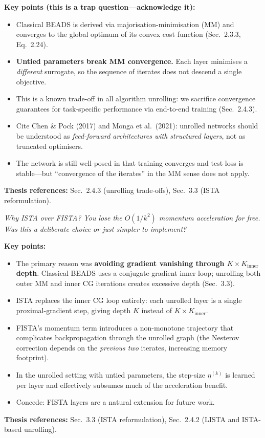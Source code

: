 \documentclass[11pt, letterpaper]{article}
\newcounter{qcounter}
\newcommand{\question}[1]{%
  \stepcounter{qcounter}%
  \begin{questionbox}[Q\theqcounter]%
    \itshape #1%
  \end{questionbox}%
}
\begin{document}
\begin{answerbox}
\textbf{Key points (this is a trap question---acknowledge it):}
\begin{itemize}[nosep]
  \item Classical BEADS is derived via majorisation-minimisation (MM)
        and converges to the global optimum of its convex cost function
        (Sec.~2.3.3, Eq.~2.24).
  \item \textbf{Untied parameters break MM convergence.}  Each layer
        minimises a \emph{different} surrogate, so the sequence of
        iterates does not descend a single objective.
  \item This is a known trade-off in all algorithm unrolling:
        we sacrifice convergence guarantees for task-specific performance
        via end-to-end training (Sec.~2.4.3).
  \item Cite Chen \& Pock (2017) and Monga et al.\ (2021): unrolled
        networks should be understood as \emph{feed-forward architectures
        with structured layers}, not as truncated optimisers.
  \item The network is still well-posed in that training converges
        and test loss is stable---but ``convergence of the iterates''
        in the MM sense does not apply.
\end{itemize}
\textbf{Thesis references:} Sec.~2.4.3 (unrolling trade-offs), Sec.~3.3 (ISTA reformulation).
\end{answerbox}

\question{Why ISTA over FISTA?  You lose the $O(1/k^2)$ momentum
acceleration for free.  Was this a deliberate choice or just simpler
to implement?}

\begin{answerbox}
\textbf{Key points:}
\begin{itemize}[nosep]
  \item The primary reason was \textbf{avoiding gradient vanishing through
        $K \times K_{\text{inner}}$ depth}.  Classical BEADS uses a
        conjugate-gradient inner loop; unrolling both outer MM and inner
        CG iterations creates excessive depth (Sec.~3.3).
  \item ISTA replaces the inner CG loop entirely: each unrolled layer
        is a single proximal-gradient step, giving depth $K$ instead
        of $K \times K_{\text{inner}}$.
  \item FISTA's momentum term introduces a non-monotone trajectory
        that complicates backpropagation through the unrolled graph
        (the Nesterov correction depends on the \emph{previous two}
        iterates, increasing memory footprint).
  \item In the unrolled setting with untied parameters, the step-size
        $\eta^{(k)}$ is learned per layer and effectively subsumes much
        of the acceleration benefit.
  \item Concede: FISTA layers are a natural extension for future work.
\end{itemize}
\textbf{Thesis references:} Sec.~3.3 (ISTA reformulation), Sec.~2.4.2 (LISTA and ISTA-based unrolling).
\end{answerbox}
\end{document}
